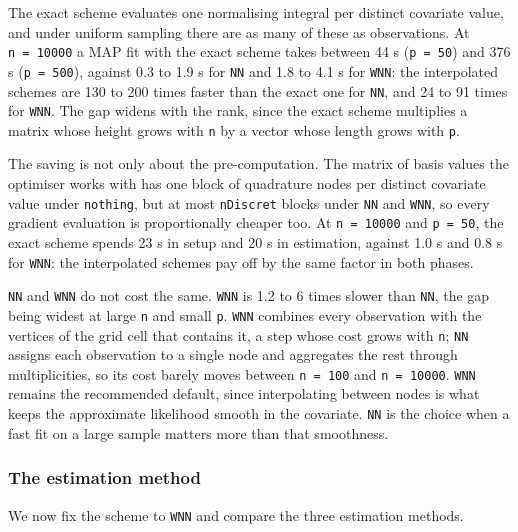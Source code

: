\documentclass[
]{article}
\begin{document}
The exact scheme evaluates one normalising integral per distinct covariate value, and under uniform sampling there are as many of these as observations. At \texttt{n\ =\ 10000} a MAP fit with the exact scheme takes between 44 s (\texttt{p\ =\ 50}) and 376 s (\texttt{p\ =\ 500}), against 0.3 to 1.9 s for \texttt{NN} and 1.8 to 4.1 s for \texttt{WNN}: the interpolated schemes are 130 to 200 times faster than the exact one for \texttt{NN}, and 24 to 91 times for \texttt{WNN}. The gap widens with the rank, since the exact scheme multiplies a matrix whose height grows with \texttt{n} by a vector whose length grows with \texttt{p}.

The saving is not only about the pre-computation. The matrix of basis values the optimiser works with has one block of quadrature nodes per distinct covariate value under \texttt{nothing}, but at most \texttt{nDiscret} blocks under \texttt{NN} and \texttt{WNN}, so every gradient evaluation is proportionally cheaper too. At \texttt{n\ =\ 10000} and \texttt{p\ =\ 50}, the exact scheme spends 23 s in setup and 20 s in estimation, against 1.0 s and 0.8 s for \texttt{WNN}: the interpolated schemes pay off by the same factor in both phases.

\texttt{NN} and \texttt{WNN} do not cost the same. \texttt{WNN} is 1.2 to 6 times slower than \texttt{NN}, the gap being widest at large \texttt{n} and small \texttt{p}. \texttt{WNN} combines every observation with the vertices of the grid cell that contains it, a step whose cost grows with \texttt{n}; \texttt{NN} assigns each observation to a single node and
aggregates the rest through multiplicities, so its cost barely moves between \texttt{n\ =\ 100} and \texttt{n\ =\ 10000}. \texttt{WNN} remains the recommended default, since interpolating between nodes is what keeps the approximate likelihood smooth in the covariate. \texttt{NN} is the choice when a fast fit on a large sample matters more
than that smoothness.

\subsubsection{The estimation method}\label{the-estimation-method}

We now fix the scheme to \texttt{WNN} and compare the three estimation methods.
\end{document}
